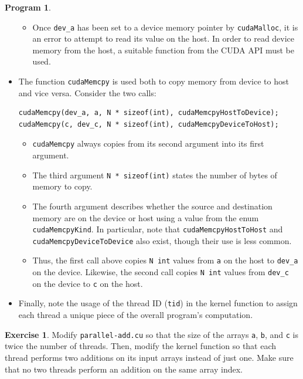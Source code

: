 \documentclass{article}
\theoremstyle{definition}
\newtheorem{program}{Program}
\newtheorem{exercise}{Exercise}
\begin{document}
\begin{program}
\begin{itemize}
\begin{itemize}
    \item 
    Once \texttt{dev\_a} has been set to a device memory pointer by \texttt{cudaMalloc}, it is an error to attempt to read its value on the host. In order to read device memory from the host, a suitable function from the CUDA API must be used. 
    \end{itemize}
    
\item 
The function \texttt{cudaMemcpy} is used both to copy memory from device to host and vice versa. Consider the two calls:
\begin{verbatim}cudaMemcpy(dev_a, a, N * sizeof(int), cudaMemcpyHostToDevice);
cudaMemcpy(c, dev_c, N * sizeof(int), cudaMemcpyDeviceToHost);
\end{verbatim}
    \begin{itemize}
        \item 
        \texttt{cudaMemcpy} always copies from its second argument into its first argument.
        
        \item
        The third argument \texttt{N * sizeof(int)} states the number of bytes of memory to copy. 
        
        \item 
        The fourth argument describes whether the source and destination memory are on the device or host using a value from the enum \texttt{cudaMemcpyKind}. In particular, note that \texttt{cudaMemcpyHostToHost} and \texttt{cudaMemcpyDeviceToDevice} also exist, though their use is less common.
        
        \item
        Thus, the first call above copies \texttt{N int} values from \texttt{a} on the host to \texttt{dev\_a} on the device. Likewise, the second call copies \texttt{N int} values from \texttt{dev\_c} on the device to \texttt{c} on the host.
    \end{itemize}
    
\item
Finally, note the usage of the thread ID (\texttt{tid}) in the kernel function to assign each thread a unique piece of the overall program's computation.
\end{itemize}

\end{program}

\begin{exercise}
Modify \texttt{parallel-add.cu} so that the size of the arrays \texttt{a}, \texttt{b}, and \texttt{c} is twice the number of threads. Then, modify the kernel function so that each thread performs two additions on its input arrays instead of just one. Make sure that no two threads perform an addition on the same array index.
\end{exercise}
\end{document}
